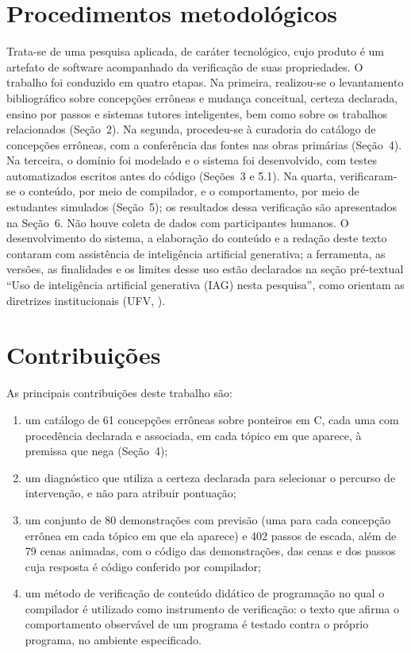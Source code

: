 \section{Procedimentos metodológicos}

Trata-se de uma pesquisa aplicada, de caráter tecnológico, cujo produto é um artefato de software acompanhado da verificação de suas propriedades. O trabalho foi conduzido em quatro etapas. Na primeira, realizou-se o levantamento bibliográfico sobre concepções errôneas e mudança conceitual, certeza declarada, ensino por passos e sistemas tutores inteligentes, bem como sobre os trabalhos relacionados (Seção~2). Na segunda, procedeu-se à curadoria do catálogo de concepções errôneas, com a conferência das fontes nas obras primárias (Seção~4). Na terceira, o domínio foi modelado e o sistema foi desenvolvido, com testes automatizados escritos antes do código (Seções~3 e 5.1). Na quarta, verificaram-se o conteúdo, por meio de compilador, e o comportamento, por meio de estudantes simulados (Seção~5); os resultados dessa verificação são apresentados na Seção~6. Não houve coleta de dados com participantes humanos. O desenvolvimento do sistema, a elaboração do conteúdo e a redação deste texto contaram com assistência de inteligência artificial generativa; a ferramenta, as versões, as finalidades e os limites desse uso estão declarados na seção pré-textual ``Uso de inteligência artificial generativa (IAG) nesta pesquisa'', como orientam as diretrizes institucionais (UFV, \citeyear{ufv2026}).

\section{Contribuições}

As principais contribuições deste trabalho são:

\begin{enumerate}
\item um catálogo de 61 concepções errôneas sobre ponteiros em C, cada uma com procedência declarada e associada, em cada tópico em que aparece, à premissa que nega (Seção~4);
\item um diagnóstico que utiliza a certeza declarada para selecionar o percurso de intervenção, e não para atribuir pontuação;
\item um conjunto de 80 demonstrações com previsão (uma para cada concepção errônea em cada tópico em que ela aparece) e 402 passos de escada, além de 79 cenas animadas, com o código das demonstrações, das cenas e dos passos cuja resposta é código conferido por compilador;
\item um método de verificação de conteúdo didático de programação no qual o compilador é utilizado como instrumento de verificação: o texto que afirma o comportamento observável de um programa é testado contra o próprio programa, no ambiente especificado.
\end{enumerate}

